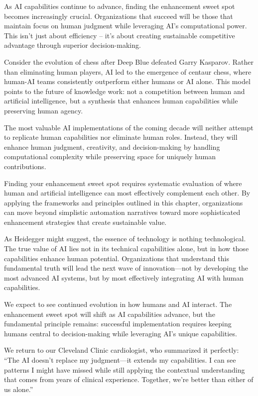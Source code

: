 \documentclass[
  Letterpaper,
]{scrbook}
\begin{document}
As AI capabilities continue to advance, finding the enhancement sweet
spot becomes increasingly crucial. Organizations that succeed will be
those that maintain focus on human judgment while leveraging AI's
computational power. This isn't just about efficiency -- it's about
creating sustainable competitive advantage through superior
decision-making.

Consider the evolution of chess after Deep Blue defeated Garry Kasparov.
Rather than eliminating human players, AI led to the emergence of
centaur chess, where human-AI teams consistently outperform either
humans or AI alone. This model points to the future of knowledge work:
not a competition between human and artificial intelligence, but a
synthesis that enhances human capabilities while preserving human
agency.

The most valuable AI implementations of the coming decade will neither
attempt to replicate human capabilities nor eliminate human roles.
Instead, they will enhance human judgment, creativity, and
decision-making by handling computational complexity while preserving
space for uniquely human contributions.

Finding your enhancement sweet spot requires systematic evaluation of
where human and artificial intelligence can most effectively complement
each other. By applying the frameworks and principles outlined in this
chapter, organizations can move beyond simplistic automation narratives
toward more sophisticated enhancement strategies that create sustainable
value.

As Heidegger might suggest, the essence of technology is nothing
technological. The true value of AI lies not in its technical
capabilities alone, but in how those capabilities enhance human
potential. Organizations that understand this fundamental truth will
lead the next wave of innovation---not by developing the most advanced
AI systems, but by most effectively integrating AI with human
capabilities.

We expect to see continued evolution in how humans and AI interact. The
enhancement sweet spot will shift as AI capabilities advance, but the
fundamental principle remains: successful implementation requires
keeping humans central to decision-making while leveraging AI's unique
capabilities.

We return to our Cleveland Clinic cardiologist, who summarized it
perfectly: ``The AI doesn't replace my judgment---it extends my
capabilities. I can see patterns I might have missed while still
applying the contextual understanding that comes from years of clinical
experience. Together, we're better than either of us alone.''
\end{document}
